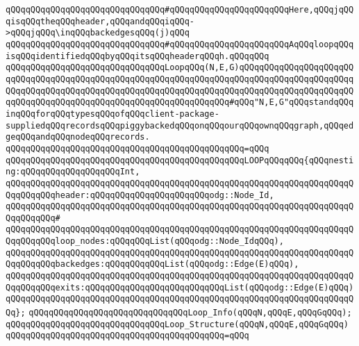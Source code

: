 \verb|qQQqqQQqqQQqqQQqqQQqqQQqqQQqqQQq#qQQqqQQqqQQqqQQqqQQqqQQqHere,qQQqjqQQqisqQQqtheqQQqheader,qQQqandqQQqiqQQq->qQQqjqQQq\inqQQqbackedgesqQQq(j)qQQq|\newline
\verb|qQQqqQQqqQQqqQQqqQQqqQQqqQQqqQQq#qQQqqQQqqQQqqQQqqQQqqQQqAqQQqloopqQQqisqQQqidentifiedqQQqbyqQQqitsqQQqheaderqQQqh.qQQqqQQq|\newline
\newline
\verb|qQQqqQQqqQQqqQQqqQQqqQQqqQQqqQQqLoopqQQq(N,E,G)qQQqqQQqqQQqqQQqqQQqqQQqqQQqqQQqqQQqqQQqqQQqqQQqqQQqqQQqqQQqqQQqqQQqqQQqqQQqqQQqqQQqqQQqqQQqqQQqqQQqqQQqqQQqqQQqqQQqqQQqqQQqqQQqqQQqqQQqqQQqqQQqqQQqqQQqqQQqqQQqqQQqqQQqqQQqqQQqqQQqqQQqqQQqqQQqqQQqqQQqqQQqqQQq#qQQq"N,E,G"qQQqstandqQQqinqQQqforqQQqtypesqQQqofqQQqclient-package-suppliedqQQqrecordsqQQqpiggybackedqQQqonqQQqourqQQqownqQQqgraph,qQQqedgeqQQqandqQQqnodeqQQqrecords.|\newline
\verb|qQQqqQQqqQQqqQQqqQQqqQQqqQQqqQQqqQQqqQQqqQQqqQQq=qQQq|\newline
\verb|qQQqqQQqqQQqqQQqqQQqqQQqqQQqqQQqqQQqqQQqqQQqqQQqLOOPqQQqqQQq{qQQqnesting:qQQqqQQqqQQqqQQqqQQqInt,|\newline
\verb|qQQqqQQqqQQqqQQqqQQqqQQqqQQqqQQqqQQqqQQqqQQqqQQqqQQqqQQqqQQqqQQqqQQqqQQqqQQqqQQqheader:qQQqqQQqqQQqqQQqqQQqqQQqodg::Node_Id,|\newline
\verb|qQQqqQQqqQQqqQQqqQQqqQQqqQQqqQQqqQQqqQQqqQQqqQQqqQQqqQQqqQQqqQQqqQQqqQQqqQQqqQQq#|\newline
\verb|qQQqqQQqqQQqqQQqqQQqqQQqqQQqqQQqqQQqqQQqqQQqqQQqqQQqqQQqqQQqqQQqqQQqqQQqqQQqqQQqloop_nodes:qQQqqQQqList(qQQqodg::Node_IdqQQq),|\newline
\verb|qQQqqQQqqQQqqQQqqQQqqQQqqQQqqQQqqQQqqQQqqQQqqQQqqQQqqQQqqQQqqQQqqQQqqQQqqQQqqQQqbackedges:qQQqqQQqqQQqList(qQQqodg::Edge(E)qQQq),|\newline
\verb|qQQqqQQqqQQqqQQqqQQqqQQqqQQqqQQqqQQqqQQqqQQqqQQqqQQqqQQqqQQqqQQqqQQqqQQqqQQqqQQqexits:qQQqqQQqqQQqqQQqqQQqqQQqqQQqList(qQQqodg::Edge(E)qQQq)|\newline
\verb|qQQqqQQqqQQqqQQqqQQqqQQqqQQqqQQqqQQqqQQqqQQqqQQqqQQqqQQqqQQqqQQqqQQqqQQq};|\newline
\newline
\verb|qQQqqQQqqQQqqQQqqQQqqQQqqQQqqQQqLoop_Info(qQQqN,qQQqE,qQQqGqQQq);|\newline
\newline
\verb|qQQqqQQqqQQqqQQqqQQqqQQqqQQqqQQqLoop_Structure(qQQqN,qQQqE,qQQqGqQQq)|\newline
\verb|qQQqqQQqqQQqqQQqqQQqqQQqqQQqqQQqqQQqqQQqqQQq=qQQq|\newline
